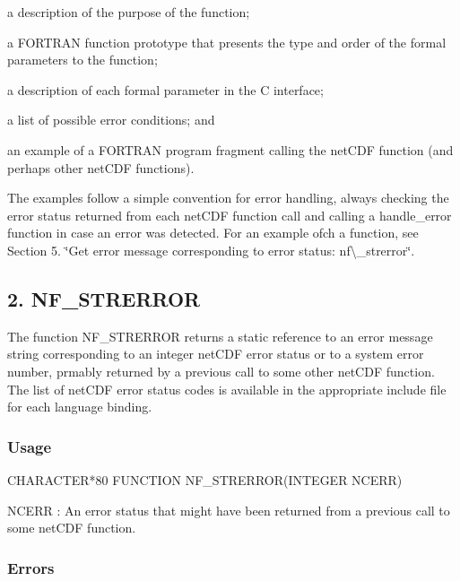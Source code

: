 \begin{DoxyItemize}
\item a description of the purpose of the function;
\item a F\+O\+R\+T\+R\+AN function prototype that presents the type and order of the formal parameters to the function;
\item a description of each formal parameter in the C interface;
\item a list of possible error conditions; and
\item an example of a F\+O\+R\+T\+R\+AN program fragment calling the net\+C\+DF function (and perhaps other net\+C\+DF functions).
\end{DoxyItemize}

The examples follow a simple convention for error handling, always checking the error status returned from each net\+C\+DF function call and calling a handle\+\_\+error function in case an error was detected. For an example ofch a function, see Section 5. \char`\"{}\+Get error message
corresponding to error status\+: nf\textbackslash{}\+\_\+strerror\char`\"{}.\hypertarget{nc_f77_interface_guide_f77_NF_STRERROR}{}\subsection{2. N\+F\+\_\+\+S\+T\+R\+E\+R\+R\+O\+R }\label{nc_f77_interface_guide_f77_NF_STRERROR}
The function N\+F\+\_\+\+S\+T\+R\+E\+R\+R\+OR returns a static reference to an error message string corresponding to an integer net\+C\+DF error status or to a system error number, prmably returned by a previous call to some other net\+C\+DF function. The list of net\+C\+DF error status codes is available in the appropriate include file for each language binding.

\subsubsection*{Usage}


\begin{DoxyCode}
CHARACTER*80 FUNCTION NF\_STRERROR(INTEGER NCERR)
\end{DoxyCode}


{\ttfamily N\+C\+E\+RR} \+: An error status that might have been returned from a previous call to some net\+C\+DF function.

\subsubsection*{Errors}

